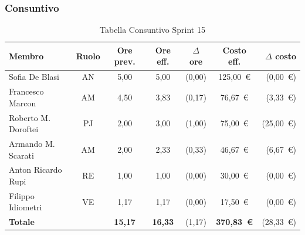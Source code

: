 \subsubsection{Consuntivo}
\begin{table}[H]
    \centering
    \renewcommand{\arraystretch}{1.3}
    \begin{tabularx}{\textwidth}{|X|c|c|c|c|c|r|}
        \hline
        \textbf{Membro} & \textbf{Ruolo} & \textbf{Ore prev.} &
        \textbf{Ore eff.} & \textbf{$\Delta$ ore} &
        \textbf{Costo eff.} & \textbf{$\Delta$ costo} \\
        \hline
        Sofia De Blasi       & AN & 5,00 & 5,00 & {\color{green}(0,00)}  & 125{,}00~\euro & {\color{green}(0{,}00~\euro)} \\
        Francesco Marcon     & AM & 4,50 & 3,83 & {\color{green}(0,17)}  & 76{,}67~\euro & {\color{green}(3{,}33~\euro)} \\
        Roberto M. Doroftei  & PJ & 2,00 & 3,00 & {\color{red}(1,00)} & 75{,}00~\euro & {\color{red}(25{,}00~\euro)} \\
        Armando M. Scarati   & AM & 2,00 & 2,33 & {\color{red}(0,33)} & 46{,}67~\euro & {\color{red}(6{,}67~\euro)} \\
        Anton Ricardo Rupi   & RE & 1,00 & 1,00 & {\color{green}(0,00)} & 30{,}00~\euro & {\color{green}(0{,}00~\euro)} \\
        Filippo Idiometri    & VE & 1,17 & 1,17 & {\color{green}(0,00)} & 17{,}50~\euro & {\color{green}(0{,}00~\euro)} \\
        \hline
        \textbf{Totale} & & \textbf{15,17} & \textbf{16,33} & {\color{red}(1,17)} & \textbf{370{,}83~\euro} & {\color{red}(28{,}33~\euro)} \\
        \hline
    \end{tabularx}
    \caption{Tabella Consuntivo Sprint 15}
\end{table}


